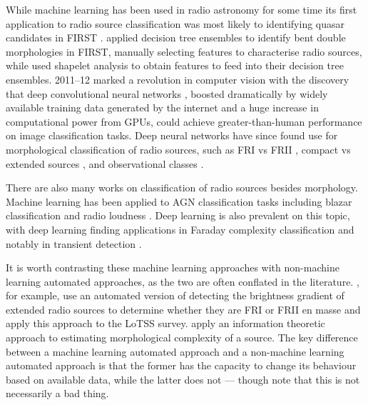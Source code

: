         While machine learning has been used in radio astronomy for some time \citep[e.g. the NVSS used neural networks to detect sidelobes;][]{condon_nrao_1998} its first application to radio source classification was most likely to identifying quasar candidates in FIRST \citep{carballo_selection_2004}. \citet{proctor06} applied decision tree ensembles to identify bent double morphologies in FIRST, manually selecting features to characterise radio sources, while \citet{bastien_classifying_2017} used shapelet analysis to obtain features to feed into their decision tree ensembles. 2011--12 marked a revolution in computer vision with the discovery that deep convolutional neural networks \citep[known as early as 1989, see][]{lecun_backpropagation_1989}, boosted dramatically by widely available training data generated by the internet and a huge increase in computational power from GPUs, could achieve greater-than-human performance on image classification tasks. Deep neural networks have since found use for morphological classification of radio sources, such as FRI vs FRII \parencites{aniyan17cnn,ma_machine_2019,lukic_morphological_2019,tang_transfer_2019,samudre_data-efficient_2020,bowles_attention-gating_2020}[see also][]{ma_radio_2018}, compact vs extended sources \citep{lukic18compact,alhassan_first_2018,lukic_morphological_2019}, and observational classes \citep{galvin_radio_2019,ralph19ae}.

        There are also many works on classification of radio sources besides morphology. Machine learning has been applied to AGN classification tasks including blazar classification \citep{arsioli_machine_2020} and radio loudness \citep{beaklini_agn_2020}. Deep learning is also prevalent on this topic, with deep learning finding applications in Faraday complexity classification \citep{brown_classifying_2018} and notably in transient detection \citep{connor_applying_2018,guo_pulsar_2019,wang_pulsar_2019,agarwal_fetch_2020,lin_pulsar_2020,zhang_applying_2020,balakrishnan_pulsar_2020}.

        It is worth contrasting these machine learning approaches with non-machine learning automated approaches, as the two are often conflated in the literature. \citet{mingo_revisiting_2019}, for example, use an automated version of detecting the brightness gradient of extended radio sources to determine whether they are FRI or FRII en masse and apply this approach to the LoTSS survey. \citet{segal_identifying_2019} apply an information theoretic approach to estimating morphological complexity of a source. The key difference between a machine learning automated approach and a non-machine learning automated approach is that the former has the capacity to change its behaviour based on available data, while the latter does not --- though note that this is not necessarily a bad thing.

